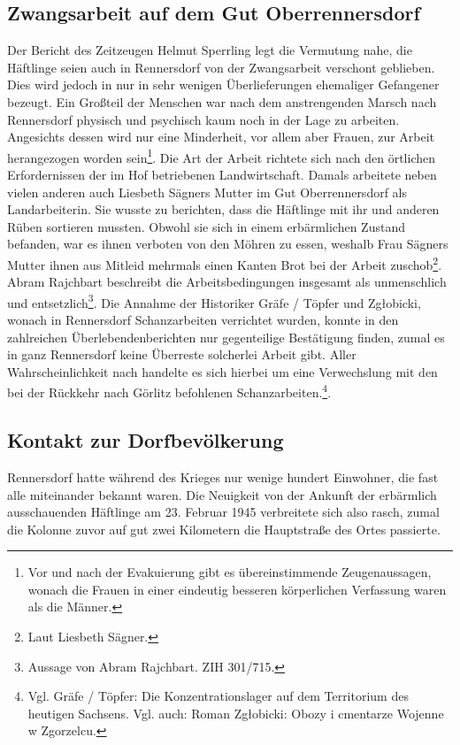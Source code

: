 \subsection{Zwangsarbeit auf dem Gut Oberrennersdorf}
Der Bericht des Zeitzeugen Helmut Sperrling legt die Vermutung nahe, die Häftlinge seien auch in Rennersdorf von der Zwangsarbeit verschont geblieben. Dies wird jedoch in nur in sehr wenigen Überlieferungen ehemaliger Gefangener bezeugt. Ein Großteil der Menschen war nach dem anstrengenden Marsch nach Rennersdorf physisch und psychisch kaum noch in der Lage zu arbeiten. Angesichts dessen wird nur eine Minderheit, vor allem aber Frauen, zur Arbeit herangezogen worden sein\footnote{Vor und nach der Evakuierung gibt es übereinstimmende Zeugenaussagen, wonach die Frauen in einer eindeutig besseren körperlichen Verfassung waren als die Männer.}.
Die Art der Arbeit richtete sich nach den örtlichen Erfordernissen der im Hof betriebenen Landwirtschaft.
Damals arbeitete neben vielen anderen auch Liesbeth Sägners Mutter im Gut Oberrennersdorf als Landarbeiterin. Sie wusste zu berichten, dass die Häftlinge mit ihr und anderen Rüben sortieren mussten. Obwohl sie sich in einem erbärmlichen Zustand befanden, war es ihnen verboten von den Möhren zu essen, weshalb Frau Sägners Mutter ihnen aus Mitleid mehrmals einen Kanten Brot bei der Arbeit zuschob\footnote{Laut Liesbeth Sägner.}. 
Abram Rajchbart beschreibt die Arbeitsbedingungen insgesamt als unmenschlich und entsetzlich\footnote{Aussage von Abram Rajchbart. ZIH 301/715.}. Die Annahme der Historiker Gräfe / Töpfer und Zg\l obicki, wonach in Rennersdorf Schanzarbeiten verrichtet wurden, konnte in den zahlreichen Überlebendenberichten nur gegenteilige Bestätigung finden, zumal es in ganz Rennersdorf keine Überreste solcherlei Arbeit gibt. Aller Wahrscheinlichkeit nach handelte es sich hierbei um eine Verwechslung mit den bei der Rückkehr nach Görlitz befohlenen Schanzarbeiten.\footnote{Vgl. Gräfe / Töpfer: Die Konzentrationslager auf dem Territorium des heutigen Sachsens. Vgl. auch: Roman Zg\l obicki: Obozy i cmentarze Wojenne w Zgorzelcu.}. 




\subsection{Kontakt zur Dorfbevölkerung}
Rennersdorf hatte während des Krieges nur wenige hundert Einwohner, die fast alle miteinander bekannt waren. Die Neuigkeit von der Ankunft der erbärmlich ausschauenden Häftlinge am 23. Februar 1945 verbreitete sich also rasch, zumal die Kolonne zuvor auf gut zwei Kilometern die Hauptstraße des Ortes passierte. 

